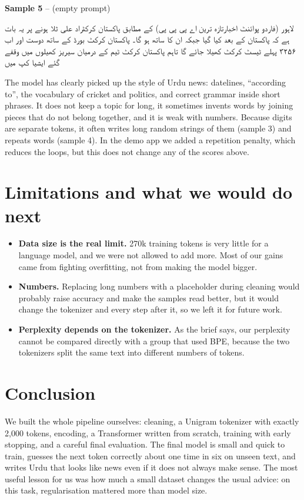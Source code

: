 \documentclass[11pt,a4paper]{article}
\begin{document}
\medskip\noindent\textbf{Sample 5} -- (empty prompt)\par\nopagebreak
\begin{urdu}لاہور (فاردو پوائنٹ اخبارتازہ ترین اے پی پی پی) کے مطابق پاکستان کرکٹراد علی ثلا ہونے پر یہ بات ہے کہ پاکستان کے بعد کیا گیا جبکہ ان کا ساتھ ہو گا۔ پاکستان کرکٹ بورڈ کے ساتھ دوست اور اب ۳۲۵۶ پہلے ٹیسٹ کرکٹ کھیلا جائے گا تاہم پاکستان کرکٹ ٹیم کے درمیان سیریز کھیلوں میں وقفے گئے ایشیا کپ میں\end{urdu}


The model has clearly picked up the style of Urdu news: datelines, ``according to'', the vocabulary of cricket and politics, and correct grammar inside short phrases. It does not keep a topic for long, it sometimes invents words by joining pieces that do not belong together, and it is weak with numbers. Because digits are separate tokens, it often writes long random strings of them (sample 3) and repeats words (sample 4). In the demo app we added a repetition penalty, which reduces the loops, but this does not change any of the scores above.

\section{Limitations and what we would do next}

\begin{itemize}
\item \textbf{Data size is the real limit.} 270k training tokens is very little for a language model, and we were not allowed to add more. Most of our gains came from fighting overfitting, not from making the model bigger.
\item \textbf{Numbers.} Replacing long numbers with a placeholder during cleaning would probably raise accuracy and make the samples read better, but it would change the tokenizer and every step after it, so we left it for future work.
\item \textbf{Perplexity depends on the tokenizer.} As the brief says, our perplexity cannot be compared directly with a group that used BPE, because the two tokenizers split the same text into different numbers of tokens.
\end{itemize}

\section{Conclusion}

We built the whole pipeline ourselves: cleaning, a Unigram tokenizer with exactly 2{,}000 tokens, encoding, a Transformer written from scratch, training with early stopping, and a careful final evaluation. The final model is small and quick to train, guesses the next token correctly about one time in six on unseen text, and writes Urdu that looks like news even if it does not always make sense. The most useful lesson for us was how much a small dataset changes the usual advice: on this task, regularisation mattered more than model size.
\end{document}
